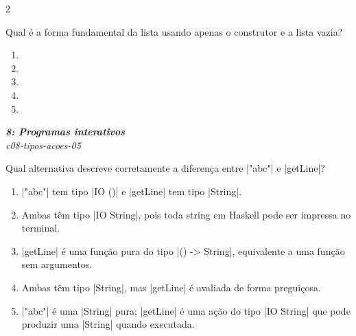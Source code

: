 \documentclass[a4paper,10pt,brazil]{article}
\begin{document}
\begin{multicols}{2}
\begin{flushright}
\end{flushright}
Qual é a forma fundamental da lista \haskellinline{['a', 'b', 'c']} usando apenas o construtor \haskellinline{(:)} e a lista vazia?

\begin{enumerate}
  \item {}

  \item {}

  \item \haskellinline{['a'] : ['b'] : ['c']}

  \item {}

  \item {}


\end{enumerate}

\begin{flushright}
  \footnotesize
  \textit{\textbf{8: Programas interativos}}\\
  \textit{c08-tipos-acoes-05}\\

\end{flushright}
Qual alternativa descreve corretamente a diferença entre \haskellinline|"abc"| e \haskellinline|getLine|?

\begin{enumerate}
  \item \haskellinline|"abc"| tem tipo \haskellinline|IO ()| e \haskellinline|getLine| tem tipo \haskellinline|String|.

  \item Ambas têm tipo \haskellinline|IO String|, pois toda string em Haskell pode ser impressa no terminal.

  \item \haskellinline|getLine| é uma função pura do tipo \haskellinline|() -> String|, equivalente a uma função sem argumentos.

  \item Ambas têm tipo \haskellinline|String|, mas \haskellinline|getLine| é avaliada de forma preguiçosa.

  \item \haskellinline|"abc"| é uma \haskellinline|String| pura; \haskellinline|getLine| é uma ação do tipo \haskellinline|IO String| que pode produzir uma \haskellinline|String| quando executada.



\end{enumerate}
\end{multicols}
\end{document}
